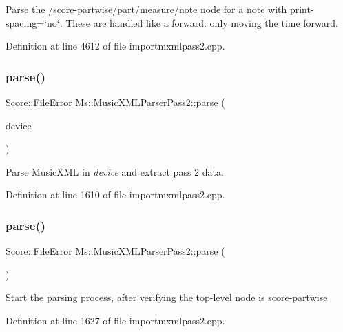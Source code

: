 Parse the /score-\/partwise/part/measure/note node for a note with print-\/spacing=\char`\"{}no\char`\"{}. These are handled like a forward\+: only moving the time forward. 

Definition at line 4612 of file importmxmlpass2.\+cpp.

\mbox{\label{class_ms_1_1_music_x_m_l_parser_pass2_aa540cd2d8b4a9ec0cd89dd6c4005901b}} 
\subsubsection{\texorpdfstring{parse()}{parse()}\hspace{0.1cm}{\footnotesize\ttfamily [1/2]}}
{\footnotesize\ttfamily Score\+::\+File\+Error Ms\+::\+Music\+X\+M\+L\+Parser\+Pass2\+::parse (\begin{DoxyParamCaption}\item[{Q\+I\+O\+Device $\ast$}]{device }\end{DoxyParamCaption})}

Parse Music\+X\+ML in {\itshape device} and extract pass 2 data. 

Definition at line 1610 of file importmxmlpass2.\+cpp.

\mbox{\label{class_ms_1_1_music_x_m_l_parser_pass2_a95e04fe5031f4c477ad44569980315b9}} 
\subsubsection{\texorpdfstring{parse()}{parse()}\hspace{0.1cm}{\footnotesize\ttfamily [2/2]}}
{\footnotesize\ttfamily Score\+::\+File\+Error Ms\+::\+Music\+X\+M\+L\+Parser\+Pass2\+::parse (\begin{DoxyParamCaption}{ }\end{DoxyParamCaption})}

Start the parsing process, after verifying the top-\/level node is score-\/partwise 

Definition at line 1627 of file importmxmlpass2.\+cpp.

